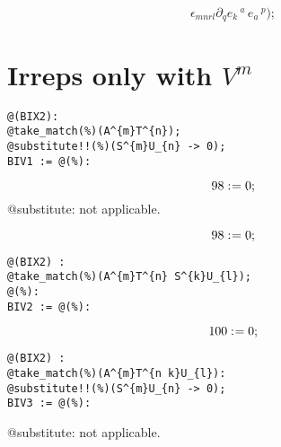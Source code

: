 \documentclass[11pt]{article}
\def\specialcolon{\mathrel{\mathop{:}}\hspace{-.5em}}
\begin{document}
\begin{dmath*}[compact, spread=2pt]
{\epsilon}_{m n r l} {\partial}_{q}{{e}_{k}\,^{a}}\,  {e}_{a}\,^{p});
\end{dmath*}
\section*{Irreps only with $V^{m}$}
{\color[named]{Blue}\begin{verbatim}
@(BIX2):
@take_match(%)(A^{m}T^{n});
@substitute!!(%)(S^{m}U_{n} -> 0);
BIV1 := @(%):
\end{verbatim}}

\begin{dmath*}[compact, spread=2pt]
98\specialcolon{}= 0;
\end{dmath*}
@substitute: not applicable.

\begin{dmath*}[compact, spread=2pt]
98\specialcolon{}= 0;
\end{dmath*}
{\color[named]{Blue}\begin{verbatim}
@(BIX2) :
@take_match(%)(A^{m}T^{n} S^{k}U_{l});
@(%):
BIV2 := @(%):
\end{verbatim}}

\begin{dmath*}[compact, spread=2pt]
100\specialcolon{}= 0;
\end{dmath*}
{\color[named]{Blue}\begin{verbatim}
@(BIX2) :
@take_match(%)(A^{m}T^{n k}U_{l}):
@substitute!!(%)(S^{m}U_{n} -> 0);
BIV3 := @(%):
\end{verbatim}}
@substitute: not applicable.
\end{document}
